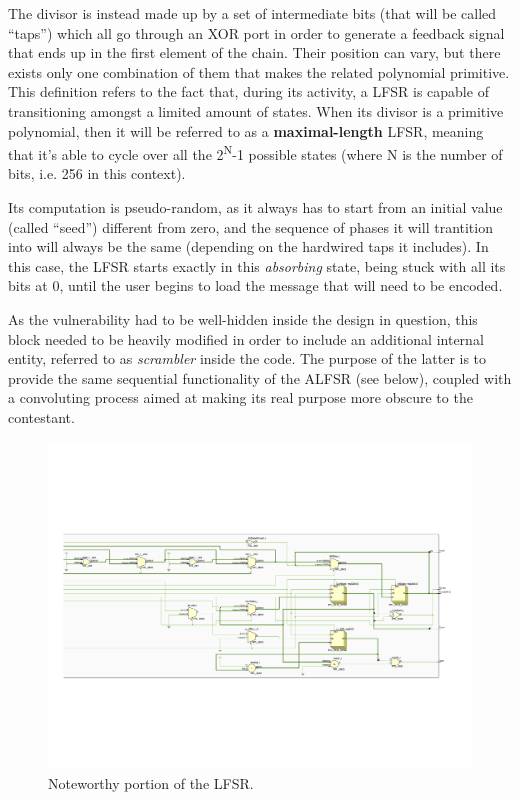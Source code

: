 The divisor is instead made up by a set of intermediate bits (that will be called ``taps'') which all go through an XOR port in order to generate a feedback signal that ends up in the first element of the chain.
Their position can vary, but there exists only one combination of them that makes the related polynomial primitive.
This definition refers to the fact that, during its activity, a LFSR is capable of transitioning amongst a limited amount of states.
When its divisor is a primitive polynomial, then it will be referred to as a \textbf{maximal-length} LFSR, meaning that it's able to cycle over all the 2\textsuperscript{N}-1 possible states (where N is the number of bits, i.e. 256 in this context).

Its computation is pseudo-random, as it always has to start from an initial value (called ``seed'') different from zero, and the sequence of phases it will trantition into will always be the same (depending on the hardwired taps it includes).
In this case, the LFSR starts exactly in this \emph{absorbing} state, being stuck with all its bits at 0, until the user begins to load the message that will need to be encoded.

As the vulnerability had to be well-hidden inside the design in question, this block needed to be heavily modified in order to include an additional internal entity, referred to as \emph{scrambler} inside the code.
The purpose of the latter is to provide the same sequential functionality of the ALFSR (see below), coupled with a convoluting process aimed at making its real purpose more obscure to the contestant.
\begin{figure}[!ht]
\vspace{0.5cm}
\includegraphics[width=\textwidth]{images/lfsr_partial.png}
\caption{Noteworthy portion of the LFSR.}
\end{figure}
